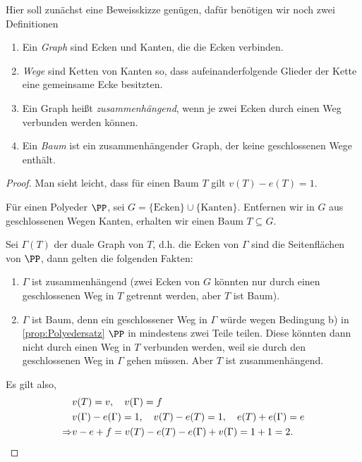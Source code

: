 Hier soll zunächst eine Beweisskizze genügen, dafür benötigen wir noch zwei
Definitionen

\begin{defnn}
\begin{enumerate}[label=(\roman{*})]
  \item Ein \emph{Graph} sind Ecken und Kanten, die die Ecken verbinden.
  \item \emph{Wege} sind Ketten von Kanten so, dass aufeinanderfolgende Glieder der
Kette eine gemeinsame Ecke besitzten.
\item  Ein Graph heißt \emph{zusammenhängend}, wenn je zwei Ecken durch einen Weg
verbunden werden können.
\item Ein \emph{Baum} ist ein zusammenhängender Graph, der keine geschlossenen
Wege enthält.\fishhere
\end{enumerate}
\end{defnn}

\begin{proof}
Man sieht leicht, dass für einen Baum $T$ gilt $v(T) - e(T)=1$.

Für einen Polyeder $\PP$, sei $G = \{\text{Ecken}\}\cup \{\text{Kanten}\}$.
Entfernen wir in $G$ aus geschlossenen Wegen Kanten, erhalten wir einen Baum
$T\subseteq G$.

Sei $\Gamma(T)$ der duale Graph von $T$, d.h. die Ecken von $\Gamma$ sind die
Seitenflächen von $\PP$, dann gelten die folgenden Fakten:
\begin{enumerate}
  \item $\Gamma$ ist zusammenhängend (zwei Ecken von $G$ könnten nur durch
  einen geschlossenen Weg in $T$ getrennt werden, aber $T$ ist Baum).
  \item $\Gamma$ ist Baum, denn ein geschlossener Weg in $\Gamma$ würde wegen
  Bedingung b) in \ref{prop:Polyedersatz} $\PP$ in mindestens zwei Teile
  teilen. Diese könnten dann nicht durch einen Weg in $T$ verbunden werden,
  weil sie durch den geschlossenen Weg in $\Gamma$ gehen müssen. Aber $T$ ist
  zusammenhängend.
\end{enumerate}
Es gilt also,
\begin{align*}
&v(T) = v,\quad v(\Gamma) = f\\
&v(\Gamma)-e(\Gamma) = 1,\quad v(T)-e(T) = 1,\quad e(T)+e(\Gamma) = e\\
\Rightarrow & v-e+f = v(T)-e(T)-e(\Gamma)+v(\Gamma) = 1 + 1 = 2.\qedhere
\end{align*}
\end{proof}

